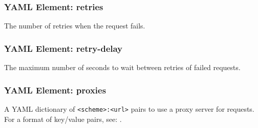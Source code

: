 \subsubsection{YAML Element: retries}\label{sec:yaml-generic-retries}
The number of retries when the request fails.

\subsubsection{YAML Element: retry-delay}\label{sec:yaml-generic-retry-delay}
The maximum number of seconds to wait between retries of failed requests.

\subsubsection{YAML Element: proxies}\label{sec:yaml-generic-proxies}
A YAML dictionary of \texttt{<scheme>:<url>} pairs to use a proxy server for requests. 
For a format of key/value pairs, see: .


